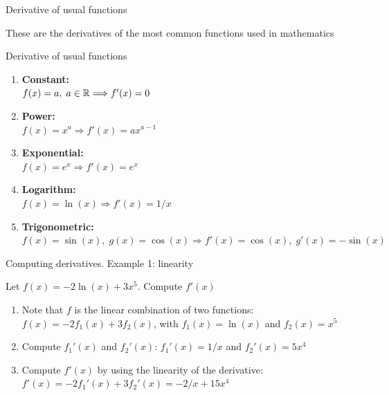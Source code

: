 \documentclass[9pt]{beamer}
\begin{document}
\begin{frame}{Derivative of usual functions}

    These are the derivatives of the most common functions used in mathematics
    
    \begin{block}{Derivative of usual functions}

        \begin{enumerate}[leftmargin = 0.5cm, label = $\bullet$, rightmargin = 0.2cm]

        \item \textbf{Constant:} \\
        $f(x) = a,\; a \in\mathbb{R} \Longrightarrow f'(x) = 0$
        
        \item \textbf{Power:} \\
        $f(x) = x^a \Longrightarrow f'(x) = a x^{a-1}$
        

        \item \textbf{Exponential:} \\
        $f(x) = e^x \Longrightarrow f'(x) = e^x$

        \item \textbf{Logarithm:} \\
        $f(x) = \ln(x) \Longrightarrow f'(x) = 1/x$

        \item \textbf{Trigonometric:} \\
        $f(x) = \sin(x),\; g(x) = \cos(x) \Longrightarrow f'(x) = \cos(x),\; g'(x) = -\sin(x)$
        
        \end{enumerate}
        
    \end{block}
    
\end{frame}

\begin{frame}{Computing derivatives. Example 1: linearity}

        Let $f(x) = -2\ln(x) + 3x^5$. Compute $f'(x)$

        \begin{enumerate}[leftmargin = 0.5cm, label = \arabic*., rightmargin = 0.2cm]

        \item Note that $f$ is the linear combination of two functions: $f(x) = -2f_1(x) + 3f_2(x)$, with $f_1(x) = \ln(x)$ and $f_2(x) = x^5$

        \item Compute $f_1'(x)$ and $f_2'(x)$: $f_1'(x) = 1/x$ and $f_2'(x) = 5x^4$

        \item Compute $f'(x)$ by using the linearity of the derivative: $f'(x) = -2f_1'(x) + 3f_2'(x) = -2/x + 15x^4$ 
        
        \end{enumerate}
    
\end{frame}
\end{document}
